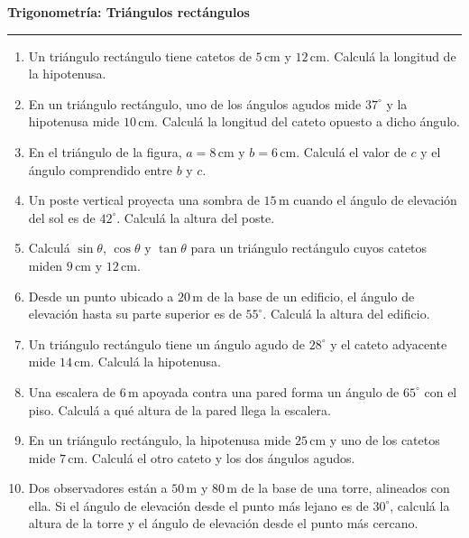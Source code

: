 \documentclass[11pt]{article}
\begin{document}
\begin{minipage}[t][0.97\textheight]{12.5cm}
\vspace{0pt}
\begin{center}
{\Large \textbf{Trigonometría: Triángulos rectángulos}}\\[2pt]
\rule{6cm}{0.5pt}
\end{center}

\vspace{0.5cm}

\begin{enumerate}[leftmargin=1.2cm, itemsep=0.55cm plus 1fill]

\item Un triángulo rectángulo tiene catetos de $5\,\text{cm}$ y $12\,\text{cm}$. Calculá la longitud de la hipotenusa.

\item En un triángulo rectángulo, uno de los ángulos agudos mide $37^\circ$ y la hipotenusa mide $10\,\text{cm}$. Calculá la longitud del cateto opuesto a dicho ángulo.

\item En el triángulo de la figura, $a = 8\,\text{cm}$ y $b = 6\,\text{cm}$. Calculá el valor de $c$ y el ángulo comprendido entre $b$ y $c$.

\item Un poste vertical proyecta una sombra de $15\,\text{m}$ cuando el ángulo de elevación del sol es de $42^\circ$. Calculá la altura del poste.

\item Calculá $\sin\theta$, $\cos\theta$ y $\tan\theta$ para un triángulo rectángulo cuyos catetos miden $9\,\text{cm}$ y $12\,\text{cm}$.

\item Desde un punto ubicado a $20\,\text{m}$ de la base de un edificio, el ángulo de elevación hasta su parte superior es de $55^\circ$. Calculá la altura del edificio.

\item Un triángulo rectángulo tiene un ángulo agudo de $28^\circ$ y el cateto adyacente mide $14\,\text{cm}$. Calculá la hipotenusa.

\item Una escalera de $6\,\text{m}$ apoyada contra una pared forma un ángulo de $65^\circ$ con el piso. Calculá a qué altura de la pared llega la escalera.

\item En un triángulo rectángulo, la hipotenusa mide $25\,\text{cm}$ y uno de los catetos mide $7\,\text{cm}$. Calculá el otro cateto y los dos ángulos agudos.

\item Dos observadores están a $50\,\text{m}$ y $80\,\text{m}$ de la base de una torre, alineados con ella. Si el ángulo de elevación desde el punto más lejano es de $30^\circ$, calculá la altura de la torre y el ángulo de elevación desde el punto más cercano.

\end{enumerate}
\end{minipage}
\end{document}
